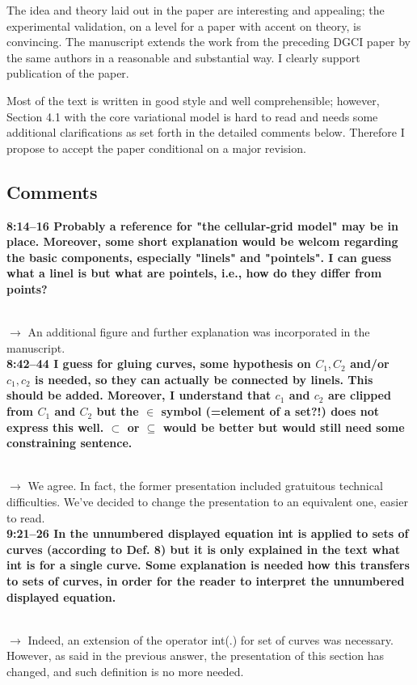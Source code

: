 \documentclass[12pt]{article}
\begin{document}
The idea and theory laid out in the paper are interesting and appealing; the
experimental validation, on a level for a paper with accent on theory, is
convincing. The manuscript extends the work from the preceding DGCI paper
by the same authors in a reasonable and substantial way. I clearly support
publication of the paper.

Most of the text is written in good style and well comprehensible; however,
Section 4.1 with the core variational model is hard to read and needs some
additional clarifications as set forth in the detailed comments below.
Therefore I propose to accept the paper conditional on a major revision.

\subsection{Comments}

\textbf{8:14--16 Probably a reference for "the cellular-grid model" may be in place.
Moreover, some short explanation would be welcom regarding the basic
components, especially "linels" and "pointels". I can guess what a linel is
but what are pointels, i.e., how do they differ from points?}

~\\
$\rightarrow$ An additional figure and further explanation was incorporated in the manuscript.
~\\

\textbf{8:42--44 I guess for gluing curves, some hypothesis on $C_1, C_2$ and/or $c_1, c_2$
is needed, so they can actually be connected by linels. This should be added.
Moreover, I understand that $c_1$ and $c_2$ are clipped from $C_1$ and $C_2$ but the
$\in$ symbol (=element of a set?!) does not express this well. $\subset$ or
$\subseteq$ would be better but would still need some constraining sentence.}

~\\
$\rightarrow$ We agree. In fact, the former presentation included gratuitous technical difficulties. We've decided to change the presentation to an equivalent one, easier to read.
~\\

\textbf{9:21--26 In the unnumbered displayed equation int is applied to sets of curves (according to Def. 8) but it is only explained in the text what int is for a single curve. Some explanation is needed how this transfers to sets of curves, in order for the reader to interpret the unnumbered displayed equation.}

~\\
$\rightarrow$ Indeed, an extension of the operator int(.) for set of curves was necessary. However, as said in the previous answer, the presentation of this section has changed, and such definition is no more needed.
~\\
\end{document}

